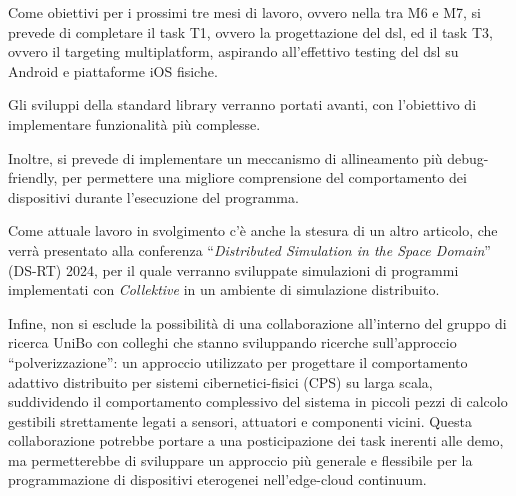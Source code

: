 \documentclass[13pt, a4paper]{article}
\newcommand{\ck}{\emph{Collektive}}
\begin{document}

Come obiettivi per i prossimi tre mesi di lavoro, ovvero nella  tra M6 e M7,
    si prevede di completare il task T1, ovvero la progettazione del \ac{dsl},
    ed il task T3, ovvero il targeting multiplatform,
    aspirando all'effettivo testing del \ac{dsl} su Android e piattaforme iOS fisiche.

Gli sviluppi della standard library verranno portati avanti, con l'obiettivo di implementare funzionalità più complesse.

Inoltre, si prevede di implementare un meccanismo di allineamento più debug-friendly,
    per permettere una migliore comprensione del comportamento dei dispositivi durante l'esecuzione del programma.

Come attuale lavoro in svolgimento c'è anche la stesura di un altro articolo, che verrà presentato alla conferenza
    ``\emph{Distributed Simulation in the Space Domain}'' (DS-RT) 2024,
    per il quale verranno sviluppate simulazioni di programmi implementati con \ck{} in un ambiente di simulazione distribuito.

Infine, non si esclude la possibilità di una collaborazione all'interno del gruppo di ricerca UniBo con colleghi che stanno sviluppando
    ricerche sull'approccio ``polverizzazione'':
    un approccio utilizzato per progettare il comportamento adattivo distribuito per sistemi cibernetici-fisici (CPS) su larga scala,
    suddividendo il comportamento complessivo del sistema in piccoli pezzi di calcolo gestibili strettamente legati a sensori, attuatori e componenti vicini.
%
Questa collaborazione potrebbe portare a una posticipazione dei task inerenti alle demo, ma permetterebbe di sviluppare
    un approccio più generale e flessibile per la programmazione di dispositivi eterogenei nell'edge-cloud continuum.



\cite[none]{none}


\end{document}
